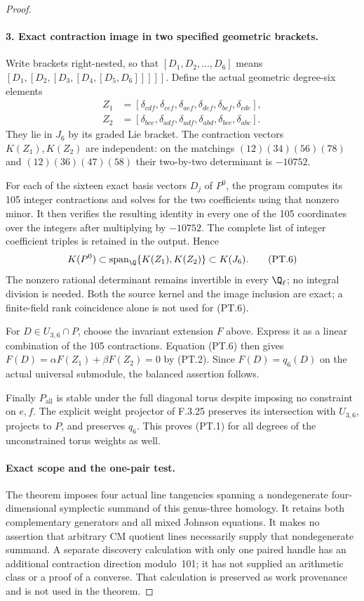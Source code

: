 \begin{proof}
\paragraph{3. Exact contraction image in two specified geometric brackets.}
Write brackets right-nested, so that
$[D_1,D_2,\ldots,D_6]$ means
$[D_1,[D_2,[D_3,[D_4,[D_5,D_6]]]]]$.
Define the actual geometric degree-six elements
\[
\begin{split}
 Z_1&=[\delta_{cdf},\delta_{cef},\delta_{aef},
          \delta_{def},\delta_{bef},\delta_{cde}],\\
 Z_2&=[\delta_{bce},\delta_{adf},\delta_{adf},
          \delta_{abd},\delta_{bce},\delta_{abc}].
\end{split}                                               \tag{PT.5}
\]
They lie in $J_6$ by its graded Lie bracket.
The contraction vectors $K(Z_1),K(Z_2)$ are
independent: on the matchings
$(12)(34)(56)(78)$ and $(12)(36)(47)(58)$
their two-by-two determinant is $-10752$.

For each of the sixteen exact basis vectors
$D_j$ of $P^0$, the program computes its
105 integer contractions and solves for the
two coefficients using that nonzero minor.
It then verifies the resulting identity in
every one of the 105 coordinates over the
integers after multiplying by $-10752$.
The complete list of integer coefficient
triples is retained in the output. Hence
\[
       K(P^0)\subset\operatorname{span}_{\Q}
                         \{K(Z_1),K(Z_2)\}\subset K(J_6).
                                                               \tag{PT.6}
\]
The nonzero rational determinant remains invertible
in every $\Q_\ell$; no integral division is needed.
Both the source kernel and the image inclusion
are exact; a finite-field rank coincidence
alone is not used for (PT.6).

For $D\in U_{3,6}\cap P$, choose the invariant
extension $F$ above. Express it as a linear
combination of the 105 contractions. Equation
(PT.6) then gives
$F(D)=\alpha F(Z_1)+\beta F(Z_2)=0$
by (PT.2). Since $F(D)=q_6(D)$ on the actual
universal submodule, the balanced assertion follows.

Finally $P_{\mathrm{all}}$ is stable under the
full diagonal torus despite imposing no
constraint on $e,f$. The explicit weight
projector of F.3.25 preserves its intersection
with $U_{3,6}$, projects to $P$, and preserves
$q_6$. This proves (PT.1) for all degrees of
the unconstrained torus weights as well.

\paragraph{Exact scope and the one-pair test.}
The theorem imposes four actual line tangencies
spanning a nondegenerate four-dimensional
symplectic summand of this genus-three homology.
It retains both complementary generators and
all mixed Johnson equations. It makes no
assertion that arbitrary CM quotient lines
necessarily supply that nondegenerate summand.
A separate discovery calculation with only
one paired handle has an additional contraction
direction modulo~101; it has not supplied an
arithmetic class or a proof of a converse.
That calculation is preserved as work provenance
and is not used in the theorem.


\end{proof}
